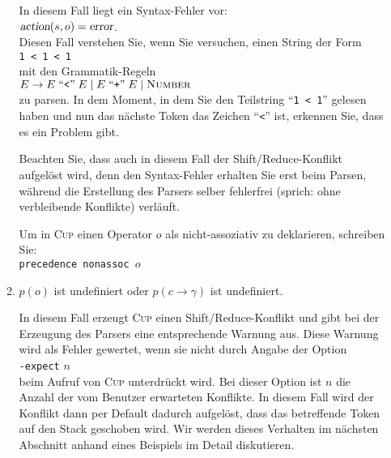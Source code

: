 \begin{enumerate}
\begin{enumerate}
            In diesem Fall liegt ein Syntax-Fehler vor:
            \\[0.2cm]
            \hspace*{1.3cm}
            $\textsl{action}(s,o) = \textsl{error}$.
            \\[0.2cm]
            Diesen Fall verstehen Sie, wenn Sie versuchen, einen String der Form
            \\[0.2cm]
            \hspace*{1.3cm}
            \texttt{1 < 1 < 1}
            \\[0.2cm]
            mit den Grammatik-Regeln
            \\[0.2cm]
            \hspace*{1.3cm}
            $E \rightarrow E \;\mbox{``\texttt{<}''}\; E \mid E \;\mbox{``\texttt{+}''}\; E \mid \textsc{Number}$
            \\[0.2cm]
            zu parsen.  In dem Moment, in dem Sie den Teilstring ``\texttt{1 < 1}'' gelesen haben
            und nun das n\"achste Token das Zeichen ``\texttt{<}'' ist, erkennen Sie, 
            dass es ein Problem gibt.  

            \remark
            Beachten Sie, dass auch in diesem Fall der Shift/Reduce-Konflikt aufgel\"ost
            wird, denn den Syntax-Fehler erhalten Sie erst beim Parsen,  w\"ahrend die
            Erstellung des Parsers selber fehlerfrei (sprich: ohne verbleibende Konflikte)
            verl\"auft.

            Um in \textsc{Cup} einen Operator $o$ als nicht-assoziativ zu deklarieren, 
            schreiben Sie:
            \\[0.2cm]
            \hspace*{1.3cm}
            \texttt{precedence nonassoc $o$}
      \item $p(o)$ ist undefiniert oder $p(c \rightarrow \gamma)$ ist undefiniert.

            In diesem Fall erzeugt \textsc{Cup} einen Shift/Reduce-Konflikt und gibt bei der
            Erzeugung des Parsers eine entsprechende Warnung aus.  Diese Warnung wird als Fehler
            gewertet,  wenn sie nicht durch Angabe der Option 
            \\[0.2cm]
            \hspace*{1.3cm}
            \texttt{-expect} $n$
            \\[0.2cm]
            beim Aufruf von \textsc{Cup} unterdr\"uckt wird.  Bei dieser Option ist $n$ die Anzahl der
            vom Benutzer erwarteten Konflikte. In diesem Fall wird der Konflikt dann per Default
            dadurch aufgel\"ost,  dass das betreffende Token auf den Stack geschoben wird. 
            Wir werden dieses Verhalten im n\"achsten Abschnitt anhand eines Beispiels im Detail 
            diskutieren. 
      \end{enumerate}

\end{enumerate}
